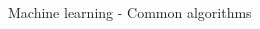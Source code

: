 \documentclass[10pt]{beamer}
\begin{document}
\begin{frame}{Machine learning - Common algorithms}
\begin{columns}
\begin{column}{0.5\textwidth}
\begin{figure}
\begin{subfigure}{.5\textwidth}
				\end{subfigure}
				\begin{subfigure}{.5\textwidth}
					\centering
				\end{subfigure}%
				\begin{subfigure}{.5\textwidth}
					\centering

\end{subfigure}
\end{figure}
\end{column}
\end{columns}
\end{frame}
\end{document}
